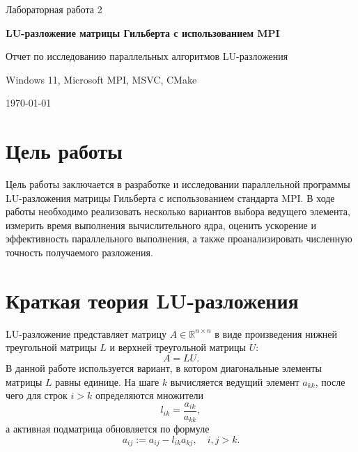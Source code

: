 \documentclass[a4paper,14pt]{extarticle}
\begin{document}
\begin{titlepage}
    \centering
    {\large Лабораторная работа 2\par}
    \vspace{1.5cm}
    {\LARGE\bfseries LU-разложение матрицы Гильберта с использованием MPI\par}
    \vspace{1.0cm}
    {\large Отчет по исследованию параллельных алгоритмов LU-разложения\par}
    \vfill
    {\large Windows 11, Microsoft MPI, MSVC, CMake\par}
    \vspace{0.5cm}
    {\large \today\par}
\end{titlepage}

\tableofcontents
\newpage

\section{Цель работы}

Цель работы заключается в разработке и исследовании параллельной программы LU-разложения матрицы Гильберта с использованием стандарта MPI. В ходе работы необходимо реализовать несколько вариантов выбора ведущего элемента, измерить время выполнения вычислительного ядра, оценить ускорение и эффективность параллельного выполнения, а также проанализировать численную точность получаемого разложения.

\section{Краткая теория LU-разложения}

LU-разложение представляет матрицу $A \in \mathbb{R}^{n \times n}$ в виде произведения нижней треугольной матрицы $L$ и верхней треугольной матрицы $U$:
\begin{equation}
    A = L U.
\end{equation}
В данной работе используется вариант, в котором диагональные элементы матрицы $L$ равны единице. На шаге $k$ вычисляется ведущий элемент $a_{kk}$, после чего для строк $i>k$ определяются множители
\begin{equation}
    l_{ik} = \frac{a_{ik}}{a_{kk}},
\end{equation}
а активная подматрица обновляется по формуле
\begin{equation}
    a_{ij} := a_{ij} - l_{ik} a_{kj}, \quad i,j>k.
\end{equation}
\end{document}
